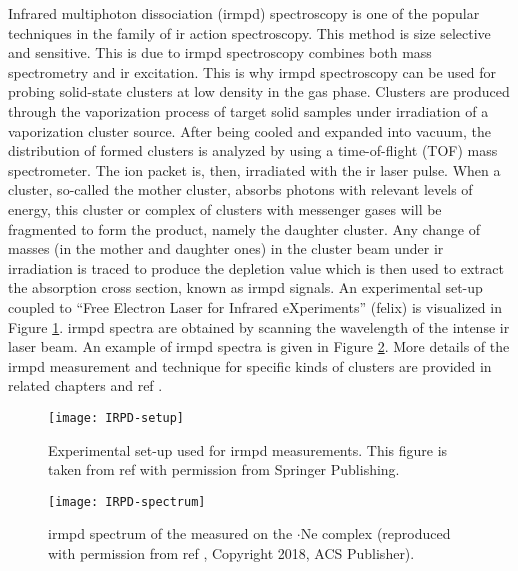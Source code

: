 \begin{refsection}
Infrared multiphoton dissociation (\acrshort{irmpd}) spectroscopy is one of the popular techniques in the family of \acrshort{ir} action spectroscopy. This method is size selective and sensitive. This is due to \acrshort{irmpd} spectroscopy combines both mass spectrometry and \acrshort{ir} excitation. This is why \acrshort{irmpd} spectroscopy can be used for probing solid-state clusters at low density in the gas phase. Clusters are produced through the vaporization process of target solid samples under irradiation of a vaporization cluster source. After being cooled and expanded into vacuum, the distribution of formed clusters is analyzed by using a time-of-flight (TOF) mass spectrometer. The ion packet is, then, irradiated with the \acrshort{ir} laser pulse. When a cluster, so-called the mother cluster, absorbs photons with relevant levels of energy, this cluster or complex of clusters with messenger gases will be fragmented to form the product, namely the daughter cluster. Any change of masses (in the mother and daughter ones) in the cluster beam under \acrshort{ir} irradiation is traced to produce the depletion value which is then used to extract the absorption cross section, known as \acrshort{irmpd} signals. An experimental set-up coupled to “Free Electron Laser for Infrared eXperiments” (\acrshort{felix}) is visualized in Figure \ref{fig:IRPD-setup}. \acrshort{irmpd} spectra are obtained by scanning the wavelength of the intense \acrshort{ir} laser beam. An example of \acrshort{irmpd} spectra is given in Figure \ref{fig:IRPD-example}. More details of the \acrshort{irmpd} measurement and technique for specific kinds of clusters are provided in related chapters and ref .       


\begin{figure}[htb!]
	\centering
	\texttt{[image: IRPD-setup]}
	\caption{Experimental set-up used for \acrshort{irmpd} measurements. This figure is taken from ref  with permission from Springer Publishing.}
	\label{fig:IRPD-setup} 
\end{figure} 


\begin{figure}[htb!]
	\centering
	\texttt{[image: IRPD-spectrum]}
	\caption{\acrshort{irmpd} spectrum of the  measured on the $\boldsymbol{\cdot}$Ne complex (reproduced with permission from ref , Copyright 2018, ACS Publisher).}
	\label{fig:IRPD-example} 
\end{figure} 











\end{refsection}
